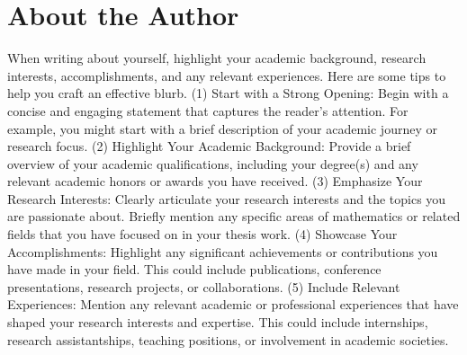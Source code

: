 \chapter*{About the Author}
When writing about yourself, highlight your academic background, research interests, accomplishments, and any relevant experiences.
Here are some tips to help you craft an effective blurb.
(1) Start with a Strong Opening:
Begin with a concise and engaging statement that captures the reader's attention. For example, you might start with a brief description of your academic journey or research focus.
(2) Highlight Your Academic Background:
Provide a brief overview of your academic qualifications, including your degree(s) and any relevant academic honors or awards you have received.
(3) Emphasize Your Research Interests:
Clearly articulate your research interests and the topics you are passionate about. Briefly mention any specific areas of mathematics or related fields that you have focused on in your thesis work.
(4) Showcase Your Accomplishments:
Highlight any significant achievements or contributions you have made in your field. This could include publications, conference presentations, research projects, or collaborations.
(5) Include Relevant Experiences:
Mention any relevant academic or professional experiences that have shaped your research interests and expertise. This could include internships, research assistantships, teaching positions, or involvement in academic societies.